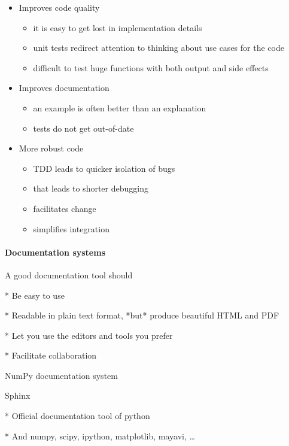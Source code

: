 \documentclass[ChapterTOCs,krantz2]{krantz} %
\begin{document}
\begin{itemize}

\item Improves code quality

\begin{itemize}
\item it is easy to get lost in implementation details
\item unit tests redirect attention to thinking about use cases for the code
\item difficult to test huge functions with both output and side effects
\end{itemize}

\item Improves documentation
\begin{itemize}
\item an example is often better than an explanation
\item tests do not get out-of-date
\end{itemize}

\item More robust code

\begin{itemize}
\item TDD leads to quicker isolation of bugs
\item that leads to shorter debugging
\item facilitates change
\item simplifies integration
\end{itemize}

\end{itemize}

\paragraph{ {\bf Documentation systems}}

A good documentation tool should

* Be easy to use

* Readable in plain text format, *but* produce beautiful HTML and PDF

* Let you use the editors and tools you prefer

* Facilitate collaboration

NumPy documentation system \cite{SciPyProceedings_27}

Sphinx

* Official documentation tool of python

* And numpy, scipy, ipython, matplotlib, mayavi, \ldots
\end{document}
